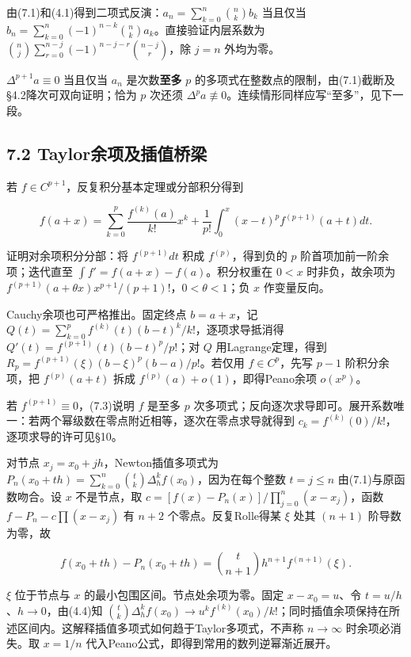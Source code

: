 \documentclass[11pt,a4paper]{article}
\begin{document}
由(7.1)和(4.1)得到二项式反演：\(a_n=\sum_{k=0}^n\binom nk b_k\) 当且仅当
\(b_n=\sum_{k=0}^n(-1)^{n-k}\binom nk a_k\)。直接验证内层系数为
\(\binom nj\sum_{r=0}^{n-j}(-1)^{n-j-r}\binom{n-j}r\)，除 \(j=n\)
外均为零。

\(\Delta^{p+1}a\equiv0\) 当且仅当 \(a_n\) 是次数\textbf{至多} \(p\)
的多项式在整数点的限制，由(7.1)截断及§4.2降次可双向证明；恰为 \(p\)
次还须 \(\Delta^pa\not\equiv0\)。连续情形同样应写``至多''，见下一段。

\subsection{7.2
Taylor余项及插值桥梁}\label{taylorux4f59ux9879ux53caux63d2ux503cux6865ux6881}

若 \(f\in C^{p+1}\)，反复积分基本定理或分部积分得到

\[
f(a+x)=\sum_{k=0}^p\frac{f^{(k)}(a)}{k!}x^k
+\frac1{p!}\int_0^x(x-t)^pf^{(p+1)}(a+t)dt.\tag{7.3}
\]

证明对余项积分分部：将 \(f^{(p+1)}dt\) 积成 \(f^{(p)}\)，得到负的 \(p\)
阶首项加前一阶余项；迭代直至 \(\int f'=f(a+x)-f(a)\)。积分权重在 \(0<x\)
时非负，故余项为
\(f^{(p+1)}(a+\theta x)x^{p+1}/(p+1)!\)，\(0<\theta<1\)；负 \(x\)
作变量反向。

Cauchy余项也可严格推出。固定终点 \(b=a+x\)，记
\(Q(t)=\sum_{k=0}^pf^{(k)}(t)(b-t)^k/k!\)，逐项求导抵消得
\(Q'(t)=f^{(p+1)}(t)(b-t)^p/p!\)；对 \(Q\) 用Lagrange定理，得到
\(R_p=f^{(p+1)}(\xi)(b-\xi)^p(b-a)/p!\)。若仅用 \(f\in C^p\)，先写
\(p-1\) 阶积分余项，把 \(f^{(p)}(a+t)\) 拆成
\(f^{(p)}(a)+o(1)\)，即得Peano余项 \(o(x^p)\)。

若 \(f^{(p+1)}\equiv0\)，(7.3)说明 \(f\) 是至多 \(p\)
次多项式；反向逐次求导即可。展开系数唯一：若两个幂级数在零点附近相等，逐次在零点求导就得到
\(c_k=f^{(k)}(0)/k!\)，逐项求导的许可见§10。

对节点 \(x_j=x_0+jh\)，Newton插值多项式为
\(P_n(x_0+th)=\sum_{k=0}^n\binom tk\Delta_h^kf(x_0)\)，因为在每个整数
\(t=j\le n\) 由(7.1)与原函数吻合。设 \(x\) 不是节点，取
\(c=[f(x)-P_n(x)]/\prod_{j=0}^n(x-x_j)\)，函数 \(f-P_n-c\prod(x-x_j)\)
有 \(n+2\) 个零点。反复Rolle得某 \(\xi\) 处其 \((n+1)\) 阶导数为零，故

\[
f(x_0+th)-P_n(x_0+th)
=\binom t{n+1}h^{n+1}f^{(n+1)}(\xi).\tag{7.4}
\]

\(\xi\) 位于节点与 \(x\) 的最小包围区间。节点处余项为零。固定
\(x-x_0=u\)、令 \(t=u/h\)、\(h\to0\)，由(4.4)知
\(\binom tk\Delta_h^kf(x_0)\to u^kf^{(k)}(x_0)/k!\)；同时插值余项保持在所述区间内。这解释插值多项式如何趋于Taylor多项式，不声称
\(n\to\infty\) 时余项必消失。取 \(x=1/n\)
代入Peano公式，即得到常用的数列逆幂渐近展开。
\end{document}
